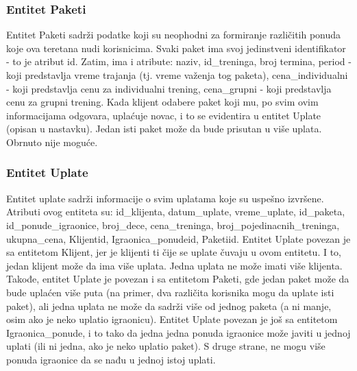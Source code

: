 \documentclass[../main.tex]{subfiles}
\begin{document}
\subsubsection{Entitet Paketi}
Entitet Paketi sadrži podatke koji su neophodni za formiranje različitih ponuda koje ova teretana nudi korisnicima. Svaki paket ima svoj jedinstveni identifikator - to je atribut id. Zatim, ima i atribute: naziv, id\_treninga, broj termina, period - koji predstavlja vreme trajanja (tj. vreme važenja tog paketa), cena\_individualni - koji predstavlja cenu za individualni trening, cena\_grupni - koji predstavlja cenu za grupni trening. Kada klijent odabere paket koji mu, po svim ovim informacijama odgovara, uplaćuje novac, i to se evidentira u entitet Uplate (opisan u nastavku). Jedan isti paket može da bude prisutan u više uplata. Obrnuto nije moguće.


\subsubsection{Entitet Uplate}

Entitet uplate sadrži informacije o svim uplatama koje su uspešno izvršene. Atributi ovog entiteta su: id\_klijenta, datum\_uplate, vreme\_uplate, id\_paketa, id\_ponude\_igraonice, broj\_dece, cena\_treninga, broj\_pojedinacnih\_treninga, ukupna\_cena, Klijentid, Igraonica\_ponudeid, Paketiid.
Entitet Uplate povezan je sa entitetom Klijent, jer je klijenti ti čije se uplate čuvaju u ovom entitetu. I to, jedan klijent može da ima više uplata. Jedna uplata ne može imati više klijenta. Takođe, entitet Uplate je povezan i sa entitetom Paketi, gde jedan paket može da bude uplaćen više puta (na primer, dva različita korisnika mogu da uplate isti paket), ali jedna uplata ne može da sadrži više od jednog paketa (a ni manje, osim ako je neko uplatio igraonicu). Entitet Uplate povezan je još sa entitetom Igraonica\_ponude, i to tako da jedna jedna ponuda igraonice može javiti u jednoj uplati (ili ni jedna, ako je neko uplatio paket). S druge strane, ne mogu više ponuda igraonice da se nađu u jednoj istoj uplati.
\end{document}
